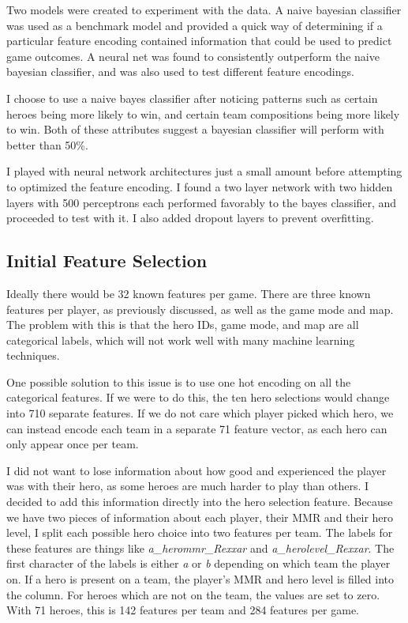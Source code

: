 \documentclass[twoside,twocolumn]{article}
\begin{document}
Two models were created to experiment with the data.  A naive bayesian classifier was used as a benchmark model and provided a quick way of determining if a particular feature encoding contained information that could be used to predict game outcomes.  A neural net was found to consistently outperform the naive bayesian classifier, and was also used to test different feature encodings.

I choose to use a naive bayes classifier after noticing patterns such as certain heroes being more likely to win, and certain team compositions being more likely to win.  Both of these attributes suggest a bayesian classifier will perform with better than 50\%.

I played with neural network architectures just a small amount before attempting to optimized the feature encoding.  I found a two layer network with two hidden layers  with 500 perceptrons each performed favorably to the bayes classifier, and proceeded to test with it.  I also added dropout layers to prevent overfitting.

\subsection{Initial Feature Selection}

Ideally there would be 32 known features per game.  There are three known features per player, as previously discussed, as well as the game mode and map.  The problem with this is that the hero IDs, game mode, and map are all categorical labels, which will not work well with many machine learning techniques.

One possible solution to this issue is to use one hot encoding on all the categorical features.  If we were to do this, the ten hero selections would change into 710 separate features.  If we do not care which player picked which hero, we can instead encode each team in a separate 71 feature vector, as each hero can only appear once per team. 

I did not want to lose information about how good and experienced the player was with their hero, as some heroes are much harder to play than others.  I decided to add this information directly into the hero selection feature.  Because we have two pieces of information about each player, their MMR and their hero level, I split each possible hero choice into two features per team.  The labels for these features are things like \textit{a\_herommr\_Rexxar} and \textit{a\_herolevel\_Rexxar}.  The first character of the labels is either \textit{a} or \textit{b} depending on which team the player on.  If a hero is present on a team, the player's MMR and hero level is filled into the column.  For heroes which are not on the team, the values are set to zero.  With 71 heroes, this is 142 features per team and 284 features per game.
\end{document}
